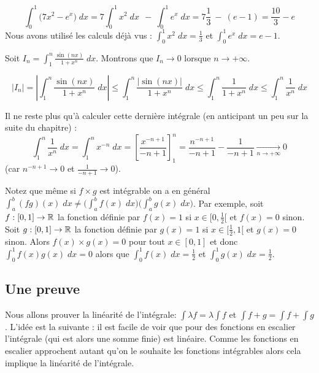 \documentclass[class=report,crop=false]{standalone}
\begin{document}
\begin{exemple}
$$\int_0^1 \big(7x^2-e^x\big) \; dx  = 7 \int_0^1 x^2\; dx \ \ - \  \int_0^1 e^x \; dx = 7 \frac 13 \ - \ (e-1) = \frac{10}{3}-e$$
Nous avons utilisé les calculs déjà vus : $\int_0^1 x^2\; dx = \frac13$ et $\int_0^1 e^x \; dx = e-1$.
\end{exemple}

\begin{exemple}
Soit $I_n = \int_1^n \frac{\sin(n x)}{1+x^n} \; dx$. Montrons que $I_n \to 0$ lorsque $n\to +\infty$.

$$|I_n| = \left| \int_1^n \frac{\sin(n x)}{1+x^n} \; dx \right| \le  \int_1^n  \frac{|\sin(n x)|}{1+x^n} \; dx
\le \int_1^n  \frac{1}{1+x^n} \; dx \le  \int_1^n  \frac{1}{x^n} \; dx$$

Il ne reste plus qu'à calculer cette dernière intégrale (en anticipant un peu sur la suite du chapitre) :
$$\int_1^n  \frac{1}{x^n} \; dx = \int_1^n x^{-n} \; dx = \left[\frac{x^{-n+1}}{-n+1}\right]_1^n
= \frac{n^{-n+1}}{-n+1} - \frac{1}{-n+1}  \xrightarrow[n\to+\infty]{} 0$$
(car $n^{-n+1} \to 0$ et $\frac{1}{-n+1} \to 0$).
\end{exemple}


\begin{remarque*}
Notez que même si $f\times g$ est intégrable on a en général $\int_a^b (f g)(x)\;dx \neq
\big(\int_a^b f(x)\;dx\big)\big(\int_a^b g(x)\;dx\big)$.
Par exemple, soit $f : [0,1] \to \mathbb{R}$ la fonction définie par $f(x)=1$ si $x\in[0,\frac12[$ et $f(x)=0$ sinon.
Soit $g : [0,1] \to \mathbb{R}$ la fonction définie par $g(x)=1$ si $x\in[\frac12,1[$ et $g(x)=0$ sinon.
Alors $f(x)\times g(x)=0$ pour tout $x\in[0,1]$ et donc $\int_0^1 f(x)g(x) \; dx=0$ alors
que $\int_0^1 f(x) \; dx= \frac12$ et $\int_0^1 g(x) \; dx=\frac12$.
\end{remarque*}




\subsection{Une preuve}

Nous allons prouver la linéarité de l'intégrale:
$\int \lambda f= \lambda \int f$ et $\int f+g = \int f + \int g$.
L'idée est la suivante : il est facile de voir que pour des fonctions en escalier
l'intégrale (qui est alors une somme finie) est linéaire. Comme les fonctions en escalier
approchent autant qu'on le souhaite les fonctions intégrables alors cela implique la linéarité
de l'intégrale.
\end{document}
